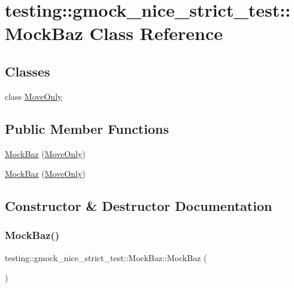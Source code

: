\hypertarget{classtesting_1_1gmock__nice__strict__test_1_1_mock_baz}{}\section{testing\+::gmock\+\_\+nice\+\_\+strict\+\_\+test\+::Mock\+Baz Class Reference}
\label{classtesting_1_1gmock__nice__strict__test_1_1_mock_baz}
\subsection*{Classes}
\begin{DoxyCompactItemize}
\item 
class \mbox{\hyperlink{classtesting_1_1gmock__nice__strict__test_1_1_mock_baz_1_1_move_only}{Move\+Only}}
\end{DoxyCompactItemize}
\subsection*{Public Member Functions}
\begin{DoxyCompactItemize}
\item 
\mbox{\hyperlink{classtesting_1_1gmock__nice__strict__test_1_1_mock_baz_a128aba703e849d19887fc4788c2db4a1}{Mock\+Baz}} (\mbox{\hyperlink{classtesting_1_1gmock__nice__strict__test_1_1_mock_baz_1_1_move_only}{Move\+Only}})
\item 
\mbox{\hyperlink{classtesting_1_1gmock__nice__strict__test_1_1_mock_baz_a128aba703e849d19887fc4788c2db4a1}{Mock\+Baz}} (\mbox{\hyperlink{classtesting_1_1gmock__nice__strict__test_1_1_mock_baz_1_1_move_only}{Move\+Only}})
\end{DoxyCompactItemize}


\subsection{Constructor \& Destructor Documentation}
\mbox{\label{classtesting_1_1gmock__nice__strict__test_1_1_mock_baz_a128aba703e849d19887fc4788c2db4a1}} 
\subsubsection{\texorpdfstring{MockBaz()}{MockBaz()}\hspace{0.1cm}{\footnotesize\ttfamily [1/2]}}
{\footnotesize\ttfamily testing\+::gmock\+\_\+nice\+\_\+strict\+\_\+test\+::\+Mock\+Baz\+::\+Mock\+Baz (\begin{DoxyParamCaption}\item[{\mbox{\hyperlink{classtesting_1_1gmock__nice__strict__test_1_1_mock_baz_1_1_move_only}{Move\+Only}}}]{ }\end{DoxyParamCaption})\hspace{0.3cm}{\ttfamily [inline]}}

